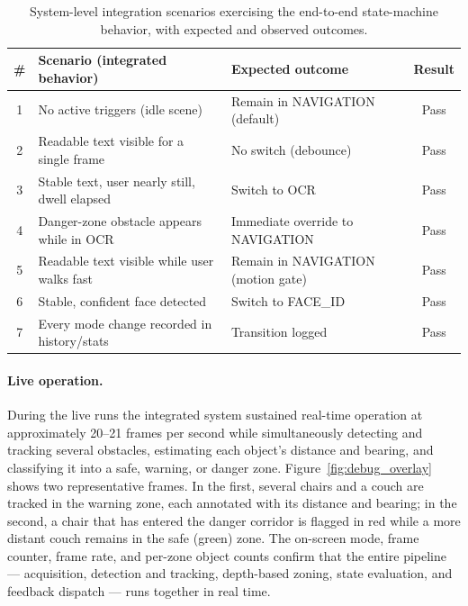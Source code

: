 \begin{table}[H]
\centering
\begin{tabular}{|c|p{}|p{}|c|}
\hline
\textbf{\#} & \textbf{Scenario (integrated behavior)} & \textbf{Expected outcome} & \textbf{Result} \\
\hline
1 & No active triggers (idle scene) & Remain in NAVIGATION (default) & Pass \\
\hline
2 & Readable text visible for a single frame & No switch (debounce) & Pass \\
\hline
3 & Stable text, user nearly still, dwell elapsed & Switch to OCR & Pass \\
\hline
4 & Danger-zone obstacle appears while in OCR & Immediate override to NAVIGATION & Pass \\
\hline
5 & Readable text visible while user walks fast & Remain in NAVIGATION (motion gate) & Pass \\
\hline
6 & Stable, confident face detected & Switch to FACE\_ID & Pass \\
\hline
7 & Every mode change recorded in history/stats & Transition logged & Pass \\
\hline
\end{tabular}
\caption{System-level integration scenarios exercising the end-to-end state-machine behavior, with expected and observed outcomes.}
\label{tab:system_tests}
\end{table}

\paragraph{Live operation.} During the live runs the integrated system sustained real-time operation at approximately 20--21 frames per second while simultaneously detecting and tracking several obstacles, estimating each object's distance and bearing, and classifying it into a safe, warning, or danger zone. Figure~\ref{fig:debug_overlay} shows two representative frames. In the first, several chairs and a couch are tracked in the warning zone, each annotated with its distance and bearing; in the second, a chair that has entered the danger corridor is flagged in red while a more distant couch remains in the safe (green) zone. The on-screen mode, frame counter, frame rate, and per-zone object counts confirm that the entire pipeline --- acquisition, detection and tracking, depth-based zoning, state evaluation, and feedback dispatch --- runs together in real time.

